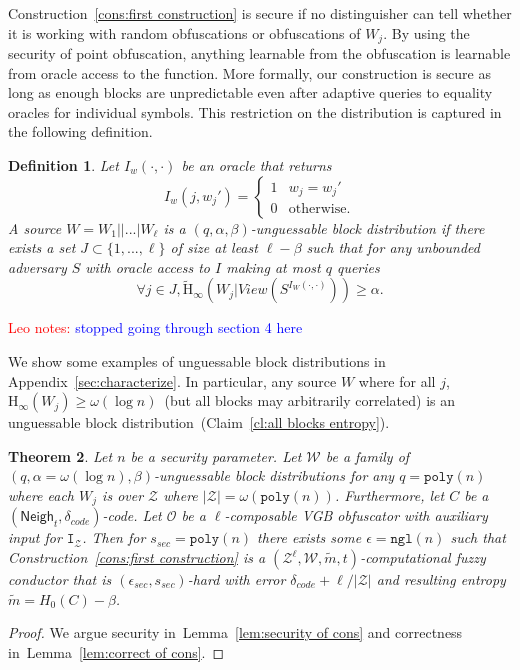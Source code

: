 \documentclass[11pt]{article}
\newcommand{\apref}[1]{\mbox{Appendix~\ref{#1}}}
\newcommand{\lemref}[1]{\mbox{Lemma~\ref{#1}}}
\newcommand{\clref}[1]{\mbox{Claim~\ref{#1}}}
\newcommand{\consref}[1]{\mbox{Construction~\ref{#1}}}
\newcommand{\class}[1]{{\ensuremath{\mathsf{#1}}}}
\newcommand{\neigh}{\ensuremath{\class{Neigh}}\xspace}
\newcommand{\poly}{\ensuremath{\mathtt{poly}}\xspace}
\newcommand{\ngl}{\ensuremath{\mathtt{ngl}}\xspace}
\newcommand{\Hoo}{\mathrm{H}_\infty}
\newcommand{\Hav}{\tilde{\mathrm{H}}_\infty}
\newtheorem{theorem}{Theorem}[section]
\newtheorem{definition}[theorem]{Definition}
\newcommand{\authnote}[2]{{\textcolor{red}{\textsf{#1 notes: }\textcolor{blue}{ #2}}\marginpar{\textcolor{red}{\textbf{!!!!!}}}}}
\newcommand{\authnote}[2]{}
\newcommand{\lnote}[1]{{\authnote{Leo}{#1}}}
\begin{document}
\consref{cons:first construction} is secure if no distinguisher can tell whether it is working with random obfuscations or obfuscations of $W_j$.  By using the security of point obfuscation, anything learnable from the obfuscation is learnable from oracle access to the function.  More formally, our construction is secure as long as enough blocks are unpredictable even after adaptive queries to equality oracles for individual symbols. This restriction on the distribution is captured in the following definition.

\begin{definition}
\label{def:block guessable}
Let $I_w (\cdot, \cdot)$ be an oracle that returns \[I_w(j, w_j')=
\begin{cases}
1 & w_j = w_j'\\
0 & \text{otherwise}.
\end{cases}
\]
A source $W = W_1||...|W_\ell$ is a $(q, \alpha, \beta)$-\emph{unguessable block distribution} if there exists a set $J\subset\{1,..., \ell\}$ of size at least $\ell -\beta$ such that for any unbounded adversary $S$ with oracle access to $I$ making at most $q$ queries
\[
\forall j\in J, \Hav(W_j |View(S^{I_{W}(\cdot, \cdot)}))\geq \alpha.
\]
\end{definition}
\lnote{stopped going through section 4 here}

We show some examples of unguessable block distributions in \apref{sec:characterize}.  In particular, any source $W$ where for all $j$, $\Hoo(W_j) \geq \omega(\log n)$~(but all blocks may arbitrarily correlated) is an unguessable block distribution~(\clref{cl:all blocks entropy}).

\begin{theorem}
\label{thm:main thm first cons}
Let $n$ be a security parameter.
Let $\mathcal{W}$ be a family of $(q,\alpha= \omega(\log n),  \beta)$-unguessable block distributions for any $q = \poly(n)$ where each $W_j$ is over $\mathcal{Z}$ where $|\mathcal{Z}| = \omega(\poly(n))$.  Furthermore, let $C$ be a $(\neigh_t, \delta_{code})$-code.  Let $\mathcal{O}$ be a $\ell$-composable VGB obfuscator with auxiliary input for $\mathtt{I}_{\mathcal{Z}}$. Then for $s_{sec} = \poly(n)$ there exists some $\epsilon=\ngl(n)$ such that \consref{cons:first construction} is a $(\mathcal{Z}^\ell, \mathcal{W}, \tilde{m}, t)$-computational fuzzy conductor that is $(\epsilon_{sec}, s_{sec})$-hard with error $\delta_{code} + \ell/|\mathcal{Z}|$ and resulting entropy $\tilde{m} =H_0(C) - \beta$.
\end{theorem}
\begin{proof}
We argue security in~\lemref{lem:security of cons} and correctness in~\lemref{lem:correct of cons}.
\end{proof}
\end{document}
